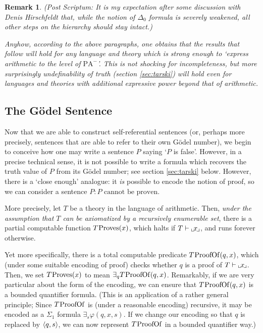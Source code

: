 \documentclass{article}
\newtheorem{remark}[theorem]{Remark}
\theoremstyle{nonumberplain}
\newcommand{\PA}{\mathrm{PA}}
\newcommand{\WPA}{\PA^-}
\DeclareMathOperator{\Proves}{\mspace{-2mu}Proves}
\DeclareMathOperator{\ProofOf}{\mspace{-2mu}ProofOf}
\DeclarePairedDelimiter{\braket}{\langle}{\rangle}
\newcommand{\gf}[1]{\raise-0.25ex\hbox{$\llcorner$}\! #1 \!\raise-0.25ex\hbox{$\lrcorner$}}
\begin{document}
\begin{remark}
(\textit{Post Scriptum:} It is my expectation after some discussion with Denis Hirschfeldt that, while the notion of $\Delta_0$ formula is severely weakened, all other steps on the hierarchy should stay intact.)

Anyhow, according to the above paragraphs, one obtains that the results that follow will hold for any language and theory which is strong enough to `express arithmetic to the level of $\WPA$'. This is not shocking for incompleteness, but more surprisingly undefinability of truth (section \ref{sec:tarski}) will hold even for languages and theories with additional expressive power beyond that of arithmetic.
\end{remark}

\subsection{The Gödel Sentence}

Now that we are able to construct self-referential sentences (or, perhaps more precisely, sentences that are able to refer to their own Gödel number), we begin to conceive how one may write a sentence $P$ saying `$P$ is false'. However, in a precise technical sense, it is not possible to write a formula which recovers the truth value of $P$ from its Gödel number; see section \ref{sec:tarski} below. However, there is a `close enough' analogue: it \emph{is} possible to encode the notion of proof, so we can consider a sentence $P \colon \text{$P$ cannot be proven}$.

More precisely, let $T$ be a theory in the language of arithmetic. Then, \emph{under the assumption that $T$ can be axiomatized by a recursively enumerable set}, there is a partial computable function $T\Proves(x)$, which halts if $T \vdash \gf x$, and runs forever otherwise.

Yet more specifically, there is a total computable predicate $T\ProofOf(q,x)$, which (under some suitable encoding of proof) checks whether $q$ is a proof of $T \vdash \gf x$. Then, we set $T\Proves(x)$ to mean $\exists_q T\ProofOf(q,x)$. Remarkably, if we are very particular about the form of the encoding, we can ensure that $T\ProofOf(q,x)$ is a bounded quantifier formula. (This is an application of a rather general principle; Since $T\ProofOf$ is (under a reasonable encoding) recursive, it may be encoded as a $\Sigma_1$ formula $\exists_s \varphi(q,x,s)$. If we change our encoding so that $q$ is replaced by $\braket{q,s}$, we can now represent $T\ProofOf$ in a bounded quantifier way.)
\end{document}
